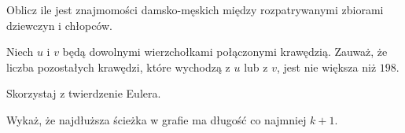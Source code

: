 
\begin{hints_list}
	\item *
	\item Oblicz ile jest znajmomości damsko-męskich między rozpatrywanymi zbiorami dziewczyn i chłopców.
	\item Niech $u$ i $v$ będą dowolnymi wierzchołkami połączonymi krawędzią. Zauważ, że liczba pozostałych krawędzi, które wychodzą z $u$ lub z $v$, jest nie większa niż $198$.
	\item Skorzystaj z twierdzenie Eulera.
	\item Wykaż, że najdłuższa ścieżka w grafie ma długość co najmniej $k + 1$.
	\item 
\end{hints_list}